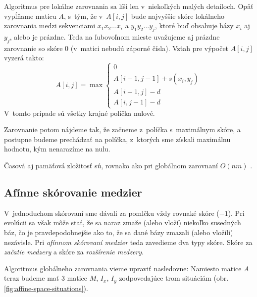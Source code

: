 Algoritmus pre lokálne zarovnania sa líši len v~niekoľkých malých detailoch. Opäť vypĺňame maticu $A$, s~tým, že v~$A[i,j]$ bude najvyššie skóre lokálneho zarovnania medzi sekvenciami $x_1x_2\dots x_i$ a $y_1y_2\dots y_j$, ktoré buď obsahuje bázy $x_i$ aj $y_j$, alebo je prázdne. Teda na ľubovoľnom mieste uvažujeme aj prázdne zarovnanie so skóre 0 (v~matici nebudú záporné čísla). Vzťah pre výpočet $A[i,j]$ vyzerá takto:
$$A[i,j] = \max \left\{
\begin{array}{l}
0\\
A[i-1,j-1]+s(x_i, y_j)\\
A[i-1,j]-d\\
A[i,j-1]-d
\end{array} \right.$$
V~tomto prípade sú všetky krajné políčka nulové.

Zarovnanie potom nájdeme tak, že začneme z~políčka s~maximálnym skóre, a postupne budeme prechádzať na políčka, z~ktorých sme získali maximálnu hodnotu, kým nenarazíme na nulu.

Časová aj pamäťová zložitosť sú, rovnako ako pri globálnom zarovnaní $O(nm)$
\cite{durbin}.

\subsection{Afínne skórovanie medzier}
\label{subsec:affine-gap-scoring}
V~jednoduchom skórovaní sme dávali za pomlčku vždy rovnaké skóre ($-1$). Pri evolúcii sa však môže stať, že sa naraz zmaže (alebo vloží) niekoľko susedných báz, čo je pravdepodobnejšie ako to, že sa dané bázy zmazali (alebo vložili) nezávisle. Pri \textit{afínnom skórovaní medzier} teda zavedieme dva typy skóre. Skóre za \textit{začatie medzery} a skóre za \textit{rozšírenie medzery}.

Algoritmus globálneho zarovnania vieme upraviť nasledovne: Namiesto matice $A$ teraz budeme mať 3 matice $M$, $I_x$, $I_y$ zodpovedajúce trom situáciám (obr. \ref{fig:affine-space-situations}).

